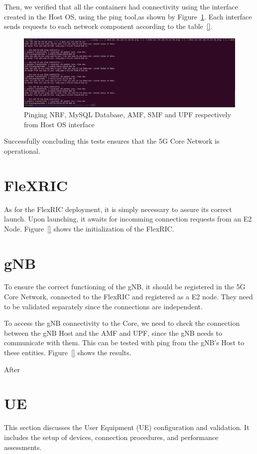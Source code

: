     Then, we verified that all the containers had connectivity using the interface created in the Host OS, using the ping tool,as shown by Figure~\ref{fig:ping_core}.
    Each interface sends requests to each network component according to the table~\ref{}.

\begin{figure}[H]
\centering
\includegraphics[width=0.5\linewidth]{figures/ping_core}
\caption[Pinging NRF, MySQL Database, AMF, SMF and UPF respectively from Host OS
interface]{Pinging NRF, MySQL Database, AMF, SMF and UPF respectively from Host OS
interface}
\label{fig:ping_core}
\end{figure}

Successfully concluding this tests ensures that the 5G Core Network is operational.



\section{FleXRIC}\label{sec:flexric}
As for the FlexRIC deployment, it is simply necessary to assure its correct launch.
Upon launching, it awaits for incomming connection requests from an E2 Node.
Figure~\ref{} shows the initialization of the FlexRIC.


\section{gNB}\label{sec:gnb}
To ensure the correct functioning of the gNB, it should be registered in the 5G Core Network, connected to the FlexRIC and registered as a E2 node.
They need to be validated separately since the connections are independent.

To access the gNB connectivity to the Core, we need to check the connection between the gNB Host and the AMF and UPF, since the gNB needs to communicate with them.
This can be tested with ping from the gNB's Host to these entities.
Figure~\ref{} shows the results.


After

\section{UE}\label{sec:ue}
This section discusses the User Equipment (UE) configuration and validation.
It includes the setup of devices, connection procedures, and performance assessments.

